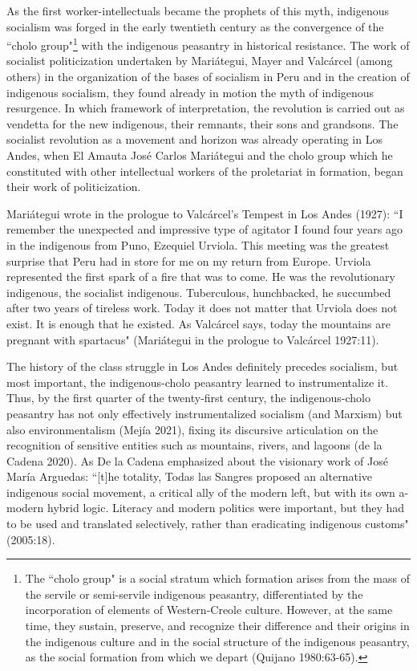 \documentclass[]{interact}
\theoremstyle{plain}%
\theoremstyle{definition}
\theoremstyle{remark}
\begin{document}
As the first worker-intellectuals became the prophets of this myth, indigenous socialism was forged in the early twentieth century as the convergence of the “cholo group"\footnote{The “cholo group" is a social stratum which formation arises from the mass of the servile or semi-servile indigenous peasantry, differentiated by the incorporation of elements of Western-Creole culture. However, at the same time, they sustain, preserve, and recognize their difference and their origins in the indigenous culture and in the social structure of the indigenous peasantry, as the social formation from which we depart (Quijano 1980:63-65).} with the indigenous peasantry in historical resistance. The work of socialist politicization undertaken by Mariátegui, Mayer and Valcárcel (among others) in the organization of the bases of socialism in Peru and in the creation of indigenous socialism, they found already in motion the myth of indigenous resurgence. In which framework of interpretation, the revolution is carried out as vendetta for the new indigenous, their remnants, their sons and grandsons. The socialist revolution as a movement and horizon was already operating in Los Andes, when El Amauta José Carlos Mariátegui and the cholo group which he constituted with other intellectual workers of the proletariat in formation, began their work of politicization. 

Mariátegui wrote in the prologue to Valcárcel's Tempest in Los Andes (1927): “I remember the unexpected and impressive type of agitator I found four years ago in the indigenous from Puno, Ezequiel Urviola. This meeting was the greatest surprise that Peru had in store for me on my return from Europe. Urviola represented the first spark of a fire that was to come. He was the revolutionary indigenous, the socialist indigenous. Tuberculous, hunchbacked, he succumbed after two years of tireless work. Today it does not matter that Urviola does not exist. It is enough that he existed. As Valcárcel says, today the mountains are pregnant with spartacus" (Mariátegui in the prologue to Valcárcel 1927:11).

The history of the class struggle in Los Andes definitely precedes socialism, but most important, the indigenous-cholo peasantry learned to instrumentalize it. Thus, by the first quarter of the twenty-first century, the indigenous-cholo peasantry has not only effectively instrumentalized socialism (and Marxism) but also environmentalism (Mejía 2021), fixing its discursive articulation on the recognition of sensitive entities such as mountains, rivers, and lagoons (de la Cadena 2020). As De la Cadena emphasized about the visionary work of José María Arguedas: “[t]he totality, Todas las Sangres proposed an alternative indigenous social movement, a critical ally of the modern left, but with its own a-modern hybrid logic. Literacy and modern politics were important, but they had to be used and translated selectively, rather than eradicating indigenous customs" (2005:18). 
\end{document}

